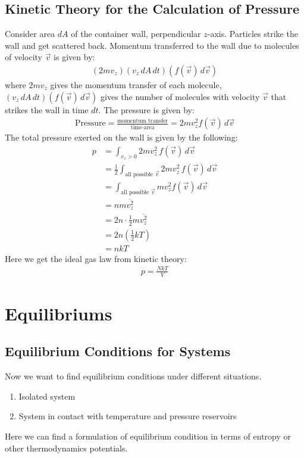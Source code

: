 \documentclass[11pt,oneside]{book}
\theoremstyle{break}
\theoremstyle{break}
\begin{document}
\newpage
\section[Pressure of a Gas]{\color{red} Kinetic Theory for the Calculation of Pressure\color{black}} 
Consider area $dA$ of the container wall, perpendicular $z$-axis. Particles strike the wall and get scattered back. Momentum transferred to the wall due to molecules of velocity $\vec{v}$ is given by:
\begin{align*}
(2mv_z)(v_z\,dA\,dt)(f(\vec{v})\,d\vec{v})
\end{align*}
where $2mv_z$ gives the momentum transfer of each molecule, $(v_z\,dA\,dt)(f(\vec{v})\,d\vec{v})$ gives the number of molecules with velocity $\vec{v}$ that strikes the wall in time $dt$. The pressure is given by:
\begin{align*}
\text{Pressure} = \frac{\text{momentum transfer}}{\text{time} \cdot \text{area}} = 2mv_z^2 f(\vec{v})\, d\vec{v}
\end{align*}
The total pressure exerted on the wall is given by the following:
\begin{align*}
p &= \int_{v_z>0}2mv_z^2\, f(\vec{v})\, d\vec{v} \\
&= \frac{1}{2}\int_{\text{all possible } \vec{v}} 2mv_z^2\, f(\vec{v})\, d\vec{v}\\
&=\int_{\text{all possible } \vec{v}} mv_z^2 f(\vec{v})\, d\vec{v}\\
&= n m\overline{v_z^2}\\
&= 2n \cdot \frac{1}{2}m \overline{v_z^2}\\ 
&= 2n \left( \frac{1}{2}kT
\right) \\
&= nkT
\end{align*}
Here we get the ideal gas law from kinetic theory:
\begin{align*}
p = \frac{NkT}{V}
\end{align*}



\newpage
\chapter{Equilibriums}

\section[Equilibrium Conditions for Systems]{\color{red}Equilibrium Conditions for Systems\color{black}}
Now we want to find equilibrium conditions under different situations.
\begin{enumerate}[topsep=3pt,itemsep=-1ex,partopsep=1ex,parsep=1ex]
\item Isolated system
\item System in contact with temperature and pressure reservoirs
\end{enumerate}
Here we can find a formulation of equilibrium condition in terms of entropy or other thermodynamics potentials.  \\
\end{document}
